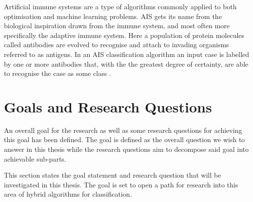 
Artificial immune systems are a type of algorithms commonly applied to both optimisation and machine learning problems. AIS gets its name from the biological inspiration drawn from the immune system, and most often more specifically the adaptive immune system. Here a population of protein molecules called antibodies are evolved to recognise and attach to invading organisms referred to as antigens. In an AIS classification algorithm an input case is labelled by one or more antibodies that, with the the greatest degree of certainty, are able to recognise the case as some class \cite{AIS:Timmis2004}. 


\section{Goals and Research Questions}
\label{sec:Goals and Research Questions}
An overall goal for the research as well as some research questions for achieving this goal has been defined. The goal is defined as the overall question we wish to answer in this thesis while the research questions aim to decompose said goal into achievable sub-parts.

This section states the goal statement and research question that will be investigated in this thesis. The goal is set to open a path for research into this area of hybrid algorithms for classification. 

